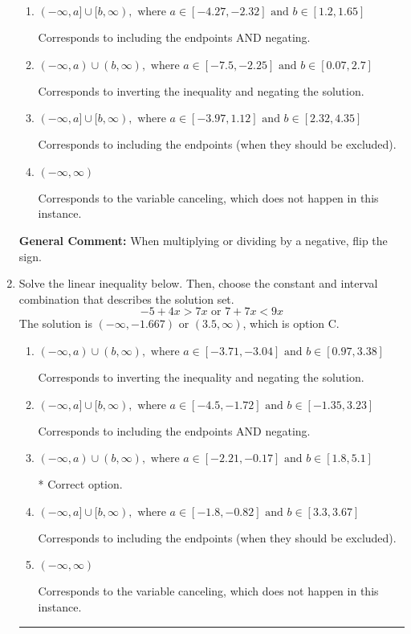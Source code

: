 \documentclass{extbook}[14pt]
\newcommand{\litem}[1]{\item #1

\rule{\textwidth}{0.4pt}}
\begin{document}
\begin{enumerate}
{\begin{enumerate}[label=\Alph*.]
 * Correct option.
\item \( (-\infty, a] \cup [b, \infty), \text{ where } a \in [-4.27, -2.32] \text{ and } b \in [1.2, 1.65] \)

Corresponds to including the endpoints AND negating.
\item \( (-\infty, a) \cup (b, \infty), \text{ where } a \in [-7.5, -2.25] \text{ and } b \in [0.07, 2.7] \)

Corresponds to inverting the inequality and negating the solution.
\item \( (-\infty, a] \cup [b, \infty), \text{ where } a \in [-3.97, 1.12] \text{ and } b \in [2.32, 4.35] \)

Corresponds to including the endpoints (when they should be excluded).
\item \( (-\infty, \infty) \)

Corresponds to the variable canceling, which does not happen in this instance.
\end{enumerate}

\textbf{General Comment:} When multiplying or dividing by a negative, flip the sign.
}
\litem{
Solve the linear inequality below. Then, choose the constant and interval combination that describes the solution set.
\[ -5 + 4 x > 7 x \text{ or } 7 + 7 x < 9 x \]The solution is \( (-\infty, -1.667) \text{ or } (3.5, \infty) \), which is option C.\begin{enumerate}[label=\Alph*.]
\item \( (-\infty, a) \cup (b, \infty), \text{ where } a \in [-3.71, -3.04] \text{ and } b \in [0.97, 3.38] \)

Corresponds to inverting the inequality and negating the solution.
\item \( (-\infty, a] \cup [b, \infty), \text{ where } a \in [-4.5, -1.72] \text{ and } b \in [-1.35, 3.23] \)

Corresponds to including the endpoints AND negating.
\item \( (-\infty, a) \cup (b, \infty), \text{ where } a \in [-2.21, -0.17] \text{ and } b \in [1.8, 5.1] \)

 * Correct option.
\item \( (-\infty, a] \cup [b, \infty), \text{ where } a \in [-1.8, -0.82] \text{ and } b \in [3.3, 3.67] \)

Corresponds to including the endpoints (when they should be excluded).
\item \( (-\infty, \infty) \)

Corresponds to the variable canceling, which does not happen in this instance.
\end{enumerate}

}
\end{enumerate}
\end{document}
